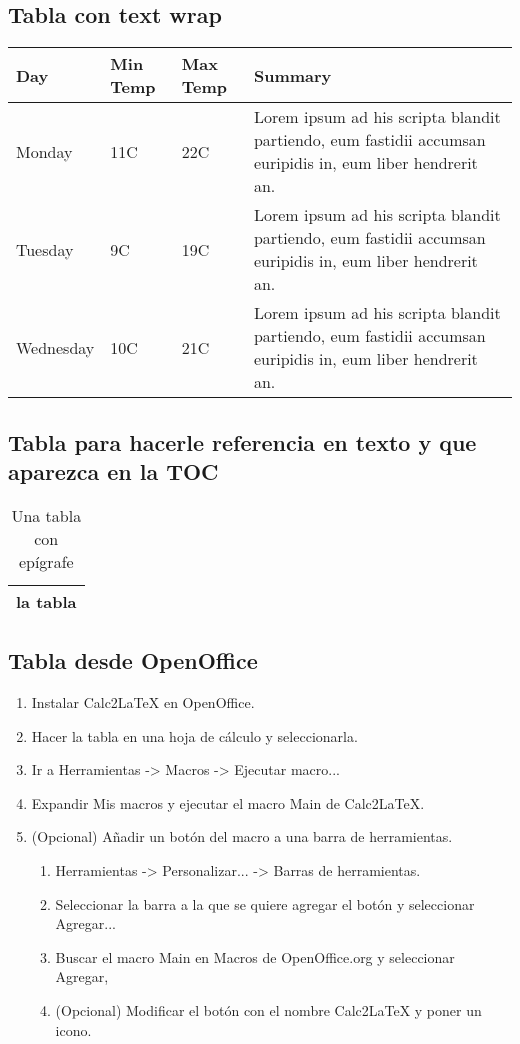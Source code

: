 \documentclass[12pt, a4paper,twoside]{article} %
\begin{document}
\subsection{Tabla con text wrap}
\begin{center}
    \begin{tabular}{ | l | l | l | p{6cm} |}
    \hline
    Day & Min Temp & Max Temp & Summary \\ \hline
    Monday & 11C & 22C & Lorem ipsum ad his scripta blandit partiendo, eum fastidii accumsan euripidis in, eum liber hendrerit an.\\ \hline
    Tuesday & 9C & 19C & Lorem ipsum ad his scripta blandit partiendo, eum fastidii accumsan euripidis in, eum liber hendrerit an. \\ \hline
    Wednesday & 10C & 21C & Lorem ipsum ad his scripta blandit partiendo, eum fastidii accumsan euripidis in, eum liber hendrerit an. \\
    \hline
    \end{tabular}
\end{center}

\subsection{Tabla para hacerle referencia en texto y que aparezca en la TOC}
\begin{table}[!ht]
  \centering
  \begin{tabular}{|l|}
  		\hline
  		la tabla \\
  		\hline
  \end{tabular}
  \caption{Una tabla con epígrafe}
  \label{tab:tablaEjemplo}
\end{table}

\subsection{Tabla desde OpenOffice}
\begin{enumerate}
\item Instalar Calc2LaTeX en OpenOffice.
\item Hacer la tabla en una hoja de cálculo y seleccionarla.
\item Ir a Herramientas -> Macros -> Ejecutar macro...
\item Expandir Mis macros y ejecutar el macro Main de Calc2LaTeX.
\item (Opcional) Añadir un botón del macro a una barra de herramientas.
\begin{enumerate}
\item Herramientas -> Personalizar... -> Barras de herramientas.
\item Seleccionar la barra a la que se quiere agregar el botón y seleccionar Agregar...
\item Buscar el macro Main en Macros de OpenOffice.org y seleccionar Agregar,
\item (Opcional) Modificar el botón con el nombre Calc2LaTeX y poner un icono.
\end{enumerate}

\end{enumerate}
\end{document}
